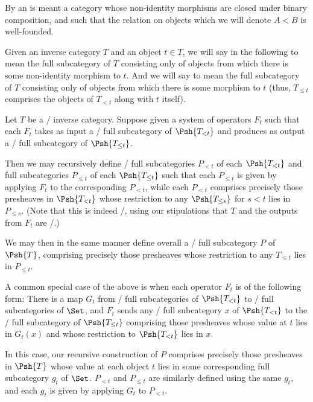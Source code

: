 By an  is meant a category whose non-identity morphisms are closed under binary composition, and such that the relation on objects  which we will denote $A < B$ is well-founded.

Given an inverse category $T$ and an object $t \in T$, we will say  in the following to mean the full subcategory of $T$ consisting only of objects from which there is some non-identity morphism to $t$. And we will say  to mean the full subcategory of $T$ consisting only of objects from which there is some morphism to $t$ (thus, $T_{\leq t}$ comprises the objects of $T_{< t}$ along with $t$ itself).

\begin{construction}
Let $T$ be a \setsmall/ inverse category. Suppose given a system of operators $F_t$ such that each $F_t$ takes as input a \setsmall/ full subcategory of $\Psh{T_{< t}}$ and produces as output a \setsmall/ full subcategory of $\Psh{T_{\leq t}}$.

Then we may recursively define \setsmall/ full subcategories $P_{< t}$ of each $\Psh{T_{< t}}$ and full subcategories $P_{\leq t}$ of each $\Psh{T_{\leq t}}$ such that each $P_{\leq t}$ is given by applying $F_t$ to the corresponding $P_{< t}$, while each $P_{< t}$ comprises precisely those presheaves in $\Psh{T_{< t}}$ whose restriction to any $\Psh{T_{\leq s}}$ for $s < t$ lies in $P_{\leq s}$. (Note that this is indeed \setsmall/, using our stipulations that $T$ and the outputs from $F_t$ are \setsmall/.)

We may then in the same manner define overall a \setsmall/ full subcategory $P$ of $\Psh{T}$, comprising precisely those presheaves whose restriction to any $T_{\leq t}$ lies in $P_{\leq t}$.

A common special case of the above is when each operator $F_t$ is of the following form: There is a map $G_t$ from \setsmall/ full subcategories of $\Psh{T_{< t}}$ to \setsmall/ full subcategories of $\Set$, and $F_t$ sends any \setsmall/ full subcategory $x$ of $\Psh{T_{< t}}$ to the \setsmall/ full subcategory of $\Psh{T_{\leq t}}$ comprising those presheaves whose value at $t$ lies in $G_t(x)$ and whose restriction to $\Psh{T_{< t}}$ lies in $x$.

In this case, our recursive construction of $P$ comprises precisely those presheaves in $\Psh{T}$ whose value at each object $t$ lies in some corresponding full subcategory $g_t$ of $\Set$. $P_{< t}$ and $P_{\leq t}$ are similarly defined using the same $g_t$, and each $g_t$ is given by applying $G_t$ to $P_{< t}$.
\end{construction}


